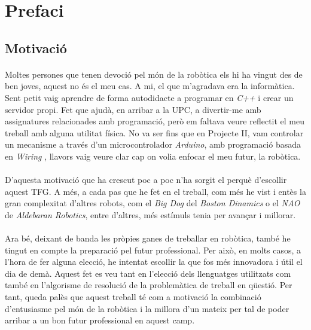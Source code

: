 \documentclass[12pt,a4paper,final,twoside]{article}
\begin{document}
\tableofcontents
\newpage
\listoffigures
\newpage
\listoftables
\newpage



\label{Prefaci}
\section*{Prefaci}

\label{Motivacio}
\subsection*{Motivació}

\paragraph{}Moltes persones que tenen devoció pel món de la robòtica els hi ha vingut des de ben joves, aquest no és el meu cas. A mi, el que m'agradava era la informàtica. Sent petit vaig aprendre de forma autodidacte a programar en \textit{C++} i crear un servidor propi. Fet que ajudà, en arribar a la UPC, a divertir-me amb assignatures relacionades amb programació, però em faltava veure reflectit el meu treball amb alguna utilitat física. No va ser fins que en Projecte II, vam controlar un mecanisme a través d'un microcontrolador \textit{Arduino}, amb programació basada en \textit{Wiring} \cite{Arduino}, llavors vaig veure clar cap on volia enfocar el meu futur, la robòtica.

\paragraph{}D'aquesta motivació que ha crescut poc a poc n'ha sorgit el perquè d'escollir aquest TFG. A més, a cada pas que he fet en el treball, com més he vist i entès la gran complexitat d'altres robots, com el \textit{Big Dog} del \textit{Boston Dinamics} o el \textit{NAO} de \textit{Aldebaran Robotics}, entre d'altres, més estímuls tenia per avançar i millorar.

\paragraph{}Ara bé, deixant de banda les pròpies ganes de treballar en robòtica, també he tingut en compte la preparació pel futur professional. Per això, en molts casos, a l'hora de fer alguna elecció, he intentat escollir la que fos més innovadora i útil el dia de demà. Aquest fet es veu tant en l'elecció dels llenguatges utilitzats com també en l'algorisme de resolució de la problemàtica de treball en qüestió. Per tant, queda palès que aquest treball té com a motivació la combinació d'entusiasme pel món de la robòtica i la millora d'un mateix per tal de poder arribar a un bon futur professional en aquest camp.
\end{document}
